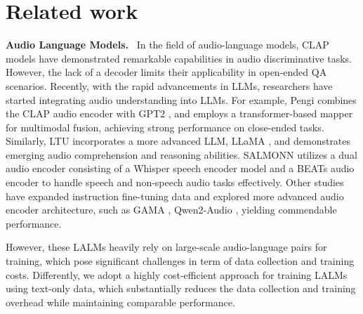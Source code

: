 \section{Related work}
\textbf{Audio Language Models.} \ 
In the field of audio-language models, CLAP models \citep{wu2023large, elizalde2023clap} have demonstrated  remarkable capabilities  in audio discriminative tasks. However, the lack of a decoder limits their applicability  in open-ended QA scenarios. Recently, with the rapid advancements in LLMs, researchers have started integrating audio understanding into LLMs. For example, Pengi   \citep{deshmukh2024pengiaudiolanguagemodel} combines the CLAP audio encoder with GPT2  \citep{radford2019language}, and employs a transformer-based mapper for multimodal fusion, achieving  strong performance on close-ended tasks. Similarly, LTU \citep{gong2024listenthinkunderstand} incorporates a more advanced LLM, LLaMA \citep{touvron2023llamaopenefficientfoundation}, and demonstrates emerging audio comprehension and reasoning  abilities. SALMONN \citep{tang2024salmonngenerichearingabilities} utilizes a dual audio encoder consisting of a Whisper speech encoder model \citep{radford2023robust} and a BEATs \citep{chen2022beatsaudiopretrainingacoustic} audio encoder to handle speech and non-speech audio tasks effectively. Other studies have expanded instruction fine-tuning data and explored more advanced audio encoder architecture, such as GAMA \citep{ghosh2024gamalargeaudiolanguagemodel}, Qwen2-Audio \citep{chu2024qwen2audiotechnicalreport}, yielding commendable performance. 

However, these LALMs heavily rely on large-scale audio-language pairs for training, which pose significant challenges in term of data collection and training costs. 
Differently, we adopt a highly cost-efficient approach for training LALMs using text-only data, which substantially reduces the data collection and training overhead while maintaining comparable performance.

